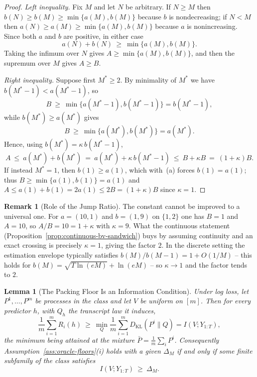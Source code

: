 \documentclass[12pt]{article}
\newtheorem{lemma}[theorem]{Lemma}
\theoremstyle{definition}
\newtheorem{remark}[theorem]{Remark}
\newcommand{\KL}{D_{\mathrm{KL}}}
\begin{document}
\begin{proof}
\emph{Left inequality.}  Fix $M$ and let $N$ be arbitrary.  If $N\ge M$ then
$b(N)\ge b(M)\ge\min\{a(M),b(M)\}$ because $b$ is nondecreasing; if $N<M$ then
$a(N)\ge a(M)\ge\min\{a(M),b(M)\}$ because $a$ is nonincreasing.  Since both
$a$ and $b$ are positive, in either case
\[
a(N)+b(N)\ \ge\ \min\{a(M),b(M)\}.
\]
Taking the infimum over $N$ gives $A\ge\min\{a(M),b(M)\}$, and then the
supremum over $M$ gives $A\ge B$.

\emph{Right inequality.}  Suppose first $M^\ast\ge2$.  By minimality of
$M^\ast$ we have $b(M^\ast-1)<a(M^\ast-1)$, so
\[
B\ \ge\ \min\{a(M^\ast-1),b(M^\ast-1)\}=b(M^\ast-1),
\]
while $b(M^\ast)\ge a(M^\ast)$ gives
\[
B\ \ge\ \min\{a(M^\ast),b(M^\ast)\}=a(M^\ast).
\]
Hence, using $b(M^\ast)=\kappa\,b(M^\ast-1)$,
\[
A
\ \le\
a(M^\ast)+b(M^\ast)
\ =\
a(M^\ast)+\kappa\,b(M^\ast-1)
\ \le\
B+\kappa B
\ =\
(1+\kappa)B .
\]
If instead $M^\ast=1$, then $b(1)\ge a(1)$, which with~(a) forces
$b(1)=a(1)$; thus $B\ge\min\{a(1),b(1)\}=a(1)$ and
$A\le a(1)+b(1)=2a(1)\le 2B=(1+\kappa)B$ since $\kappa=1$.
\end{proof}

\begin{remark}[Role of the Jump Ratio]
\label{rem:sandwich-jump}
The constant cannot be improved to a universal one.  For $a=(10,1)$ and
$b=(1,9)$ on $\{1,2\}$ one has $B=1$ and $A=10$, so $A/B=10=1+\kappa$ with
$\kappa=9$.  What the continuous statement
(Proposition~\ref{prop:continuous-bv-sandwich}) buys by assuming continuity and
an exact crossing is precisely $\kappa=1$, giving the factor $2$.  In the
discrete setting the estimation envelope typically satisfies
$b(M)/b(M-1)=1+O(1/M)$ -- this holds for
$b(M)=\sqrt{T\ln(eM)}+\ln(eM)$ -- so $\kappa\to1$ and the factor tends to $2$.
\end{remark}

\begin{lemma}[The Packing Floor Is an Information Condition]
\label{lem:packing-criterion}
Under log loss, let $P^1,\dots,P^m$ be processes in the class and let $V$ be
uniform on $[m]$.  Then for every predictor $h$, with $Q_h$ the transcript law
it induces,
\[
\frac1m\sum_{i=1}^{m}R_i(h)
\ \ge\
\min_Q\frac1m\sum_{i=1}^{m}\KL(P^i\|Q)
=
I(V;Y_{1:T}),
\]
the minimum being attained at the mixture $\bar P=\frac1m\sum_iP^i$.
Consequently Assumption~\ref{ass:oracle-floors}(i) holds with a given
$\Delta_M$ if and only if some finite subfamily of the class satisfies
\[
I(V;Y_{1:T})\ \ge\ \Delta_M .
\]
\end{lemma}
\end{document}
